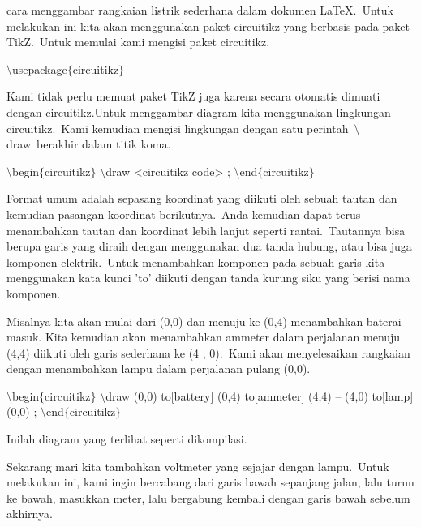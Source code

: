 \noindent 
cara menggambar rangkaian listrik sederhana dalam dokumen LaTeX. Untuk melakukan ini kita akan menggunakan paket circuitikz yang berbasis pada paket TikZ. Untuk memulai kami mengisi paket circuitikz.
\par


\noindent 
$\setminus$usepackage$ \{ $circuitikz$ \} $ 
\par


\noindent 
Kami tidak perlu memuat paket TikZ juga karena secara otomatis dimuati dengan circuitikz.Untuk menggambar diagram kita menggunakan lingkungan circuitikz. Kami kemudian mengisi lingkungan dengan satu perintah $\setminus$draw berakhir dalam titik koma.
\par


\noindent 
 $\setminus$begin$ \{ $circuitikz$ \} $ $\setminus$draw <circuitikz code> ; $\setminus$end$ \{ $circuitikz$ \} $ 
\par


\noindent 
Format umum adalah sepasang koordinat yang diikuti oleh sebuah tautan dan kemudian pasangan koordinat berikutnya. Anda kemudian dapat terus menambahkan tautan dan koordinat lebih lanjut seperti rantai. Tautannya bisa berupa garis yang diraih dengan menggunakan dua tanda hubung, atau bisa juga komponen elektrik. Untuk menambahkan komponen pada sebuah garis kita menggunakan kata kunci 'to' diikuti dengan tanda kurung siku yang berisi nama komponen.
\par


\noindent 
Misalnya kita akan mulai dari (0,0) dan menuju ke (0,4) menambahkan baterai masuk. Kita kemudian akan menambahkan ammeter dalam perjalanan menuju (4,4) diikuti oleh garis sederhana ke (4 , 0). Kami akan menyelesaikan rangkaian dengan menambahkan lampu dalam perjalanan pulang (0,0).
\par


\noindent 
 $\setminus$begin$ \{ $circuitikz$ \} $ $\setminus$draw (0,0) to[battery] (0,4) to[ammeter] (4,4) -- (4,0) to[lamp] (0,0) ; $\setminus$end$ \{ $circuitikz$ \} $ 
\par


\noindent 
Inilah diagram yang terlihat seperti dikompilasi.
\par


\noindent 
Sekarang mari kita tambahkan voltmeter yang sejajar dengan lampu. Untuk melakukan ini, kami ingin bercabang dari garis bawah sepanjang jalan, lalu turun ke bawah, masukkan meter, lalu bergabung kembali dengan garis bawah sebelum akhirnya.
\par


